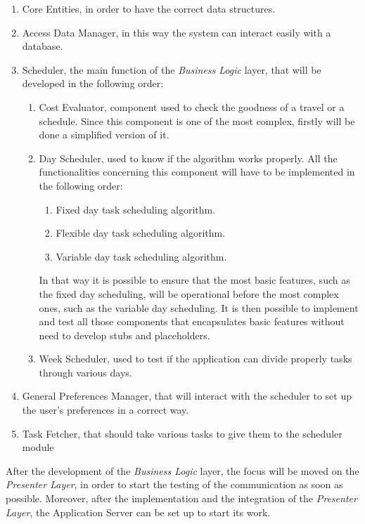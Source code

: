 \begin{enumerate}
    \item Core Entities, in order to have the correct data structures.
    \item Access Data Manager, in this way the system can interact easily with a database.
    \item Scheduler, the main function of the \emph{Business Logic} layer, that will be developed in the following order:
    \begin{enumerate}
        \item Cost Evaluator, component used to check the goodness of a travel or a schedule. Since this component is one of the most complex, firstly will be done a simplified version of it.
        \item Day Scheduler, used to know if the algorithm works properly. All the functionalities concerning this component will have to be implemented in the following order: 
        \begin{enumerate}
            \item Fixed day task scheduling algorithm.
            \item Flexible day task scheduling algorithm.
            \item Variable day task scheduling algorithm.
        \end{enumerate}
        In that way it is possible to ensure that the most basic features, such as the fixed day scheduling, will be operational before the most complex ones, such as the variable day scheduling. It  is then possible to implement and test all those components that encapsulates basic features without need to develop stubs and placeholders.
        \item Week Scheduler, used to test if the application can divide properly tasks through various days.
    \end{enumerate}
    \item General Preferences Manager, that will interact with the scheduler to set up the user's preferences in a correct way.
    \item Task Fetcher, that should take various tasks to give them to the scheduler module
\end{enumerate}

After the development of the \emph{Business Logic} layer, the focus will be moved on the \emph{Presenter Layer}, in order to start the testing of the communication as soon as possible. Moreover, after the implementation and the integration of the \emph{Presenter Layer}, the Application Server can be set up to start its work.

